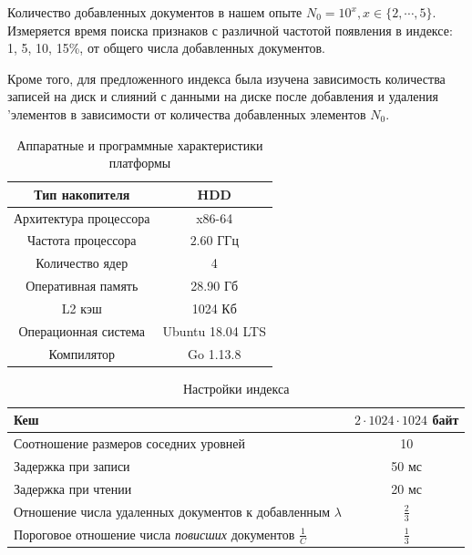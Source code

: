 Количество добавленных документов в нашем опыте $N_0 = 10^{x}, x \in \{2, \cdots, 5\}$.
Измеряется время поиска признаков с различной частотой появления в индексе: 1,
5, 10, 15\%, от общего числа добавленных документов.

Кроме того, для предложенного индекса была изучена зависимость количества
записей на диск и слияний с данными на диске после добавления и удаления 'элементов
в зависимости от количества добавленных элементов $N_0$.

\begin{table}[H]
\caption{Аппаратные и программные характеристики платформы}
\centering
\small
\singlespacing
\begin{tabular}{|c|c|}
      \hline
      Тип накопителя         & HDD              \\ \hline
      Архитектура процессора & x86-64           \\ \hline
      Частота процессора     & $2.60$ ГГц       \\ \hline
      Количество ядер        & 4                \\ \hline
      Оперативная память     & 28.90 Гб         \\ \hline
      L2 кэш                 & 1024 Кб          \\ \hline
      Операционная система   & Ubuntu 18.04 LTS \\ \hline
      Компилятор             & Go 1.13.8        \\ \hline
\end{tabular}
\end{table}

\begin{table}[H]
      \caption{Настройки индекса}
      \centering
      \small
      \singlespacing
      \begin{tabular}{|l|c|}
            \hline
            Кеш                                                                           & $2\cdot 1024\cdot 1024$ байт \\ \hline
            Соотношение размеров соседних уровней                                         & 10               \\ \hline
            Задержка при записи                                                           & 50 мс            \\ \hline
            Задержка при чтении                                                           & 20 мс            \\ \hline
            Отношение числа удаленных документов к добавленным $\lambda$                  & $\frac{2}{3}$    \\ \hline
            Пороговое отношение числа \textit{повисших} документов $\frac{1}{C}$          & $\frac{1}{3}$    \\ \hline
\end{tabular}
\end{table}

